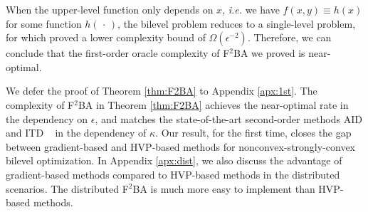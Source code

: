 \documentclass[twoside,11pt]{article}
\begin{document}


\begin{remark} 
When the upper-level function only depends on $x$, \textit{i.e.}
we have $f(x,y) \equiv h(x)$ for some function $h(\,\cdot\,)$, the bilevel problem reduces to a single-level problem, for which \citet{carmon2020lower} proved a lower complexity bound of $\Omega(\epsilon^{-2})$. Therefore, we can conclude that the
first-order oracle complexity of {F${}^2$BA} we proved is near-optimal. 
\end{remark}

We defer the proof of Theorem \ref{thm:F2BA} to Appendix \ref{apx:1st}. The complexity of F${}^2$BA in Theorem \ref{thm:F2BA}
achieves the near-optimal rate in the dependency on $\epsilon$, and matches the state-of-the-art second-order methods AID and ITD ~\citep{ji2021bilevel} in the dependency of $\kappa$. Our result, for the first time, closes the gap between gradient-based and HVP-based methods for nonconvex-strongly-convex bilevel optimization.
In Appendix \ref{apx:dist}, we also discuss the advantage of gradient-based methods compared to HVP-based methods in the distributed scenarios.
The distributed F${}^2$BA is much more easy to implement than HVP-based methods.
\end{document}

